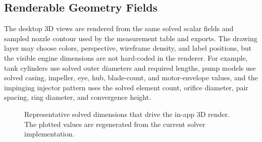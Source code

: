 \documentclass[11pt]{article}
\begin{document}
\subsection{Renderable Geometry Fields}
The desktop 3D views are rendered from the same solved scalar fields and sampled nozzle contour used by the measurement table and exports. The drawing layer may choose colors, perspective, wireframe density, and label positions, but the visible engine dimensions are not hard-coded in the renderer. For example, tank cylinders use solved outer diameters and required lengths, pump models use solved casing, impeller, eye, hub, blade-count, and motor-envelope values, and the impinging injector pattern uses the solved element count, orifice diameter, pair spacing, ring diameter, and convergence height.

\begin{table}[H]
\centering
\caption{Selected solved fields used directly by the live 3D renderer for the default pump-fed impinging-injector case.}
\end{table}

\begin{figure}[H]
\centering
{}
\caption{Representative solved dimensions that drive the in-app 3D render. The plotted values are regenerated from the current solver implementation.}
\end{figure}
\end{document}
